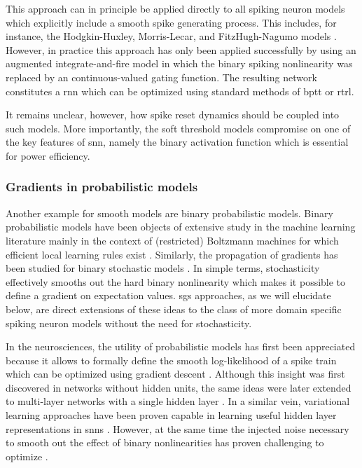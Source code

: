 \documentclass[journal,onecolumn,11pt]{IEEEtran}
\begin{document}
This approach can in principle be applied
directly to all spiking neuron models which explicitly include a smooth spike
generating process. This includes, for instance,  the Hodgkin-Huxley,
Morris-Lecar, and FitzHugh-Nagumo models \cite{Gerstner_etal14_neurdyna}.
However, in practice this approach has only been applied successfully by
\cite{Huh_Sejnowski17_graddesc} using an augmented integrate-and-fire model in
which the binary spiking nonlinearity was replaced by an continuous-valued
gating function.  The resulting network constitutes a \gls{rnn} which can be
optimized using standard methods of \gls{bptt} or \gls{rtrl}.  

It remains unclear, however, how spike reset dynamics should be coupled into
such models. More importantly, the soft threshold models compromise on one of
the key features of \gls{snn}, namely the binary activation function which is
essential for power efficiency.


\subsubsection{Gradients in probabilistic models}

Another example for smooth models are binary probabilistic models. 
Binary probabilistic models have been objects of extensive study in the machine
learning literature mainly in the context of (restricted) Boltzmann machines
for which efficient local learning rules exist \cite{ackley_learning_1985}. 
Similarly, the propagation of gradients has been studied for binary stochastic
models \cite{bengio_estimating_2013}. 
In simple terms, stochasticity effectively smooths out the hard binary
nonlinearity which makes it possible to define a gradient on expectation values.
\glspl{sg} approaches, as we will elucidate below, are direct extensions of
these ideas to the class of more domain specific spiking neuron models without
the need for stochasticity.  

In the neurosciences, the utility of probabilistic models 
has first been appreciated because it allows to formally define the smooth
log-likelihood of a spike train which can be optimized using gradient descent
\cite{pfister_optimal_2006}.
Although this insight was first discovered in networks without hidden units,
the same ideas were later extended to multi-layer networks with a single hidden
layer \cite{gardner_learning_2015}.
In a similar vein, variational learning approaches have been proven capable
in learning useful hidden layer representations in \glspl{snn}
\cite{brea_matching_2013, rezende_stochastic_2014,Mostafa_Cauwenberghs18}.
However, at the same time the injected noise necessary to smooth out the effect
of binary nonlinearities has proven challenging to optimize
\cite{rezende_stochastic_2014}.
\end{document}

